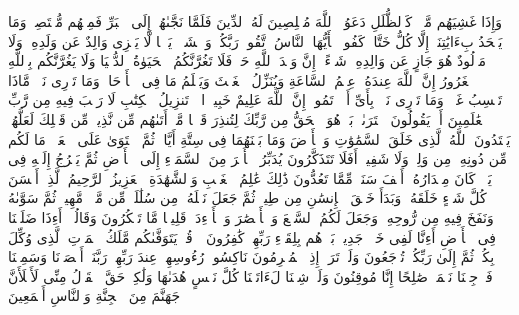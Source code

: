 \startbuffer[\q:31:32]
وَإِذَا غَشِیَهُم مَّوۡجࣱ كَٱلظُّلَلِ دَعَوُا۟ ٱللَّهَ مُخۡلِصِینَ لَهُ ٱلدِّینَ فَلَمَّا نَجَّىٰهُمۡ إِلَى ٱلۡبَرِّ فَمِنۡهُم مُّقۡتَصِدࣱۚ وَمَا یَجۡحَدُ بِءَایَٰتِنَاۤ إِلَّا كُلُّ خَتَّارࣲ كَفُورࣲ%
\stopbuffer%
\startbuffer[\q:31:33]
یَٰۤأَیُّهَا ٱلنَّاسُ ٱتَّقُوا۟ رَبَّكُمۡ وَٱخۡشَوۡا۟ یَوۡمࣰا لَّا یَجۡزِی وَالِدٌ عَن وَلَدِهِۦ وَلَا مَوۡلُودٌ هُوَ جَازٍ عَن وَالِدِهِۦ شَیۡءًاۚ إِنَّ وَعۡدَ ٱللَّهِ حَقࣱّۖ فَلَا تَغُرَّنَّكُمُ ٱلۡحَیَوٰةُ ٱلدُّنۡیَا وَلَا یَغُرَّنَّكُم بِٱللَّهِ ٱلۡغَرُورُ%
\stopbuffer%
\startbuffer[\q:31:34]
إِنَّ ٱللَّهَ عِندَهُۥ عِلۡمُ ٱلسَّاعَةِ وَیُنَزِّلُ ٱلۡغَیۡثَ وَیَعۡلَمُ مَا فِی ٱلۡأَرۡحَامِۖ وَمَا تَدۡرِی نَفۡسࣱ مَّاذَا تَكۡسِبُ غَدࣰاۖ وَمَا تَدۡرِی نَفۡسُۢ بِأَیِّ أَرۡضࣲ تَمُوتُۚ إِنَّ ٱللَّهَ عَلِیمٌ خَبِیرُۢ%
\stopbuffer%
\startbuffer[\q:32:1]
الۤمۤ%
\stopbuffer%
\startbuffer[\q:32:2]
تَنزِیلُ ٱلۡكِتَٰبِ لَا رَیۡبَ فِیهِ مِن رَّبِّ ٱلۡعَٰلَمِینَ%
\stopbuffer%
\startbuffer[\q:32:3]
أَمۡ یَقُولُونَ ٱفۡتَرَىٰهُۚ بَلۡ هُوَ ٱلۡحَقُّ مِن رَّبِّكَ لِتُنذِرَ قَوۡمࣰا مَّاۤ أَتَىٰهُم مِّن نَّذِیرࣲ مِّن قَبۡلِكَ لَعَلَّهُمۡ یَهۡتَدُونَ%
\stopbuffer%
\startbuffer[\q:32:4]
ٱللَّهُ ٱلَّذِی خَلَقَ ٱلسَّمَٰوَٰتِ وَٱلۡأَرۡضَ وَمَا بَیۡنَهُمَا فِی سِتَّةِ أَیَّامࣲ ثُمَّ ٱسۡتَوَىٰ عَلَى ٱلۡعَرۡشِۖ مَا لَكُم مِّن دُونِهِۦ مِن وَلِیࣲّ وَلَا شَفِیعٍۚ أَفَلَا تَتَذَكَّرُونَ%
\stopbuffer%
\startbuffer[\q:32:5]
یُدَبِّرُ ٱلۡأَمۡرَ مِنَ ٱلسَّمَاۤءِ إِلَى ٱلۡأَرۡضِ ثُمَّ یَعۡرُجُ إِلَیۡهِ فِی یَوۡمࣲ كَانَ مِقۡدَارُهُۥۤ أَلۡفَ سَنَةࣲ مِّمَّا تَعُدُّونَ%
\stopbuffer%
\startbuffer[\q:32:6]
ذَٰلِكَ عَٰلِمُ ٱلۡغَیۡبِ وَٱلشَّهَٰدَةِ ٱلۡعَزِیزُ ٱلرَّحِیمُ%
\stopbuffer%
\startbuffer[\q:32:7]
ٱلَّذِیۤ أَحۡسَنَ كُلَّ شَیۡءٍ خَلَقَهُۥۖ وَبَدَأَ خَلۡقَ ٱلۡإِنسَٰنِ مِن طِینࣲ%
\stopbuffer%
\startbuffer[\q:32:8]
ثُمَّ جَعَلَ نَسۡلَهُۥ مِن سُلَٰلَةࣲ مِّن مَّاۤءࣲ مَّهِینࣲ%
\stopbuffer%
\startbuffer[\q:32:9]
ثُمَّ سَوَّىٰهُ وَنَفَخَ فِیهِ مِن رُّوحِهِۦۖ وَجَعَلَ لَكُمُ ٱلسَّمۡعَ وَٱلۡأَبۡصَٰرَ وَٱلۡأَفۡءِدَةَۚ قَلِیلࣰا مَّا تَشۡكُرُونَ%
\stopbuffer%
\startbuffer[\q:32:10]
وَقَالُوۤا۟ أَءِذَا ضَلَلۡنَا فِی ٱلۡأَرۡضِ أَءِنَّا لَفِی خَلۡقࣲ جَدِیدِۭۚ بَلۡ هُم بِلِقَاۤءِ رَبِّهِمۡ كَٰفِرُونَ%
\stopbuffer%
\startbuffer[\q:32:11]
۞ قُلۡ یَتَوَفَّىٰكُم مَّلَكُ ٱلۡمَوۡتِ ٱلَّذِی وُكِّلَ بِكُمۡ ثُمَّ إِلَىٰ رَبِّكُمۡ تُرۡجَعُونَ%
\stopbuffer%
\startbuffer[\q:32:12]
وَلَوۡ تَرَىٰۤ إِذِ ٱلۡمُجۡرِمُونَ نَاكِسُوا۟ رُءُوسِهِمۡ عِندَ رَبِّهِمۡ رَبَّنَاۤ أَبۡصَرۡنَا وَسَمِعۡنَا فَٱرۡجِعۡنَا نَعۡمَلۡ صَٰلِحًا إِنَّا مُوقِنُونَ%
\stopbuffer%
\startbuffer[\q:32:13]
وَلَوۡ شِئۡنَا لَءَاتَیۡنَا كُلَّ نَفۡسٍ هُدَىٰهَا وَلَٰكِنۡ حَقَّ ٱلۡقَوۡلُ مِنِّی لَأَمۡلَأَنَّ جَهَنَّمَ مِنَ ٱلۡجِنَّةِ وَٱلنَّاسِ أَجۡمَعِینَ%
